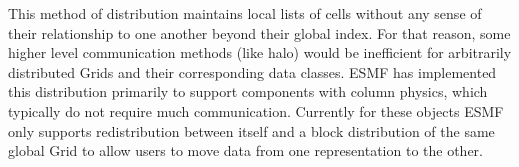 
This method of distribution maintains local lists of cells without any sense
of their relationship to one another beyond their global index.  For that
reason, some higher level communication methods (like halo) would be 
inefficient for arbitrarily distributed Grids and their corresponding data
classes.  ESMF has implemented this distribution primarily to support 
components with column physics, which typically do not require much 
communication.  Currently for these objects ESMF only supports redistribution
between itself and a block distribution of the same global Grid to allow users
to move data from one representation to the other.
